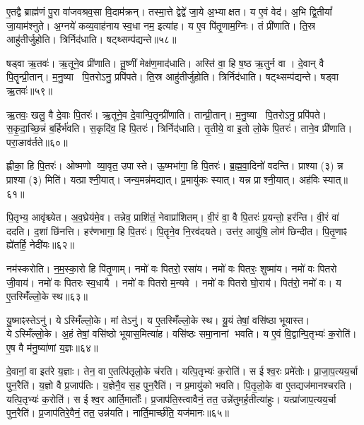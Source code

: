 ए॒तद्वै ब्राह्म॑णं पु॒रा वा॑जवश्रव॒सा वि॒दाम॑क्रन्।
तस्मा॒त्ते द्वेद्वे॑ जा॒ये अ॒भ्याक्षत।
य ए॒वं वेद॑।
अ॒भि द्वि॒तीयां᳚ जा॒याम॑श्नुते।
अ॒ग्नये॑ कव्य॒वाह॑नाय स्व॒धा नम॒ इत्या॑ह।
य ए॒व पि॑तृ॒णाम॒ग्निः।
तं प्री॑णाति।
ति॒स्र आहु॑तीर्जुहोति।
त्रिर्निद॑धाति।
षट्थ्सम्प॑द्यन्ते॥५८॥

षड्वा ऋ॒तवः॑।
ऋ॒तूने॒व प्री॑णाति।
तू॒ष्णीं मेक्ष॑ण॒माद॑धाति।
अस्ति॑ वा॒ हि ष॒ष्ठ ऋ॒तुर्न वा।
दे॒वान् वै पि॒तॄन्प्री॒तान्।
म॒नु॒ष्या पि॒तरोऽनु॒ प्रपि॑पते।
ति॒स्र आहु॑तीर्जुहोति।
त्रिर्निद॑धाति।
षट्थ्सम्प॑द्यन्ते।
षड्वा ऋ॒तवः॑॥५९॥

ऋ॒तवः॒ खलु॒ वै दे॒वाः पि॒तरः॑।
ऋ॒तूने॒व दे॒वान्पि॒तॄन्प्री॑णाति।
तान्प्री॒तान्।
म॒नु॒ष्या पि॒तरोऽनु॒ प्रपि॑पते।
स॒कृ॒दा॒च्छि॒न्नं ब॒र्\mbox{}हिर्भ॑वति।
स॒कृदि॑व॒ हि पि॒तरः॑।
त्रिर्निद॑धाति।
तृ॒तीये॒ वा इ॒तो लो॒के पि॒तरः॑।
ताने॒व प्री॑णाति।
परा॒ङाव॑र्तते॥६०॥

ह्लीका॒ हि पि॒तरः॑।
ओष्मणो व्या॒वृत॒ उपास्ते।
ऊ॒ष्मभा॑गा॒ हि पि॒तरः॑।
ब्र॒ह्म॒वा॒दिनो॑ वदन्ति।
प्राश्या (३) न्न प्राश्या (३) मिति॑।
यत्प्राश्नी॒यात्।
जन्य॒मन्न॑मद्यात्।
प्र॒मायु॑कः स्यात्।
यन्न प्राश्नी॒यात्।
अह॑विः स्यात्॥६१॥

पि॒तृभ्य॒ आवृ॑श्च्येत।
अ॒व॒घ्रेय॑मे॒व।
तन्नेव॒ प्राशि॑तं॒ नेवाप्रा॑शितम्।
वी॒रं वा॒ वै पि॒तरः॑ प्र॒यन्तो॒ हर॑न्ति।
वी॒रं वा॑ ददति।
द॒शां छि॑नत्ति।
हर॑णभागा॒ हि पि॒तरः॑।
पि॒तॄने॒व नि॒रव॑दयते।
उत्त॑र॒ आयु॑षि॒ लोम॑ छिन्दीत।
पि॒तृ॒णाꣴ ह्ये॑तर्\mbox{}हि॒ नेदी॑यः॥६२॥

नम॑स्करोति।
न॒म॒स्का॒रो हि पि॑तृ॒णाम्।
नमो॑ वः पितरो॒ रसा॑य।
नमो॑ वः पितरः॒ शुष्मा॑य।
नमो॑ वः पितरो जी॒वाय॑।
नमो॑ वः पितरः स्व॒धायै।
नमो॑ वः पितरो म॒न्यवे।
नमो॑ वः पितरो घो॒राय॑।
पित॑रो॒ नमो॑ वः।
य ए॒तस्मिँ॑ल्लो॒के स्थ॥६३॥

यु॒ष्माꣴस्तेऽनु॑।
येऽस्मिँल्लो॒के।
मां तेऽनु॑।
य ए॒तस्मिँ॑ल्लो॒के स्थ।
यू॒यं तेषां॒ वसि॑ष्ठा भूयास्त।
येऽस्मिँल्लो॒के।
अ॒हं तेषां॒ वसि॑ष्ठो भूयास॒मित्या॑ह।
वसि॑ष्ठः समा॒नानां भवति।
य ए॒वं वि॒द्वान्पि॒तृभ्यः॑ क॒रोति॑।
ए॒ष वै म॑नु॒ष्या॑णां य॒ज्ञः॥६४॥

दे॒वानां॒ वा इत॑रे य॒ज्ञाः।
तेन॒ वा ए॒तत्पि॑तृलो॒के च॑रति।
यत्पि॒तृभ्यः॑ क॒रोति॑।
स ई\hspace{0.4ex}\hspace{-0.4ex}श्व॒रः प्रमे॑तोः।
प्रा॒जा॒प॒त्यय॒र्चा पुन॒रैति॑।
य॒ज्ञो वै प्र॒जाप॑तिः।
य॒ज्ञेनै॒व स॒ह पुन॒रैति॑।
न प्र॒मायु॑को भवति।
पि॒तृ॒लो॒के वा ए॒तद्यज॑मानश्चरति।
यत्पि॒तृभ्यः॑ क॒रोति॑।
स ई\hspace{0.4ex}\hspace{-0.4ex}श्व॒र आर्ति॒मार्तोः᳚।
प्र॒जाप॑ति॒स्त्वावैनं॒ तत॒ उन्ने॑तुमर्\mbox{}ह॒तीत्या॑हुः।
यत्प्रा॑जाप॒त्यय॒र्चा पुन॒रैति॑।
प्र॒जाप॑तिरे॒वैनं॒ तत॒ उन्न॑यति।
नार्ति॒मार्च्छ॑ति॒ यज॑मानः॥६५॥\anuvakamend[इत्य॑श्नुते पद्यन्ते पद्यन्ते॒ षड्वा ऋ॒तवो॑ वर्त॒ते\-ऽह॑विः स्या॒न्नेदी॑यः॒ स्थ य॒ज्ञो यज॑मानश्चरति॒ यत्पि॒तृभ्यः॑ क॒रोति॒ पञ्च॑ च]




